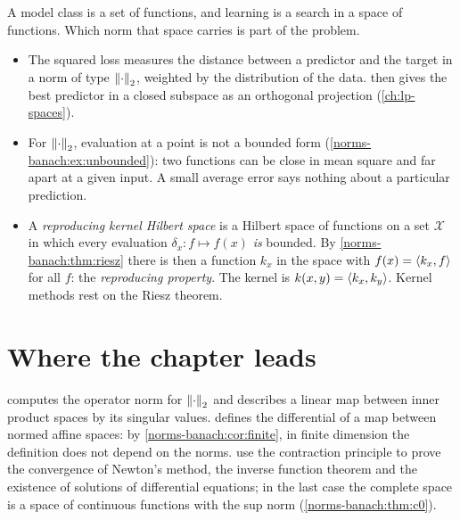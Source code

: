 \begin{notechapter}
\begin{mlthread}
A model class is a set of functions, and learning is a search in a space
of functions. Which norm that space carries is part of the problem.
\begin{itemize}[nosep]
  \item The squared loss measures the distance between a predictor and the
        target in a norm of type $\left\|\cdot\right\|_2$, weighted by the
        distribution of the data.  then
        gives the best predictor in a closed subspace as an orthogonal
        projection (\cref{ch:lp-spaces}).
  \item For $\left\|\cdot\right\|_2$, evaluation at a point is not a bounded form
        (\cref{norms-banach:ex:unbounded}): two functions can be close in
        mean square and far apart at a given input. A small average error
        says nothing about a particular prediction.
  \item A \emph{reproducing kernel Hilbert space} is a Hilbert space of
        functions on a set $\mathcal X$ in which every evaluation
        $\delta_x:f\mapsto f(x)$ \emph{is} bounded. By
        \cref{norms-banach:thm:riesz} there is then a function $k_x$ in
        the space with $f(x) = \left\langle k_x, f \right\rangle$ for all $f$: the
        \emph{reproducing property}. The kernel is
        $k(x, y) = \left\langle k_x, k_y \right\rangle$. Kernel methods rest on the Riesz
        theorem.
\end{itemize}
\end{mlthread}

\section{Where the chapter leads}\label{norms-banach:sec:outlook}

 computes the operator norm for $\left\|\cdot\right\|_2$ and
describes a linear map between inner product spaces by its singular
values.  defines the differential of a map between
normed affine spaces: by \cref{norms-banach:cor:finite}, in finite
dimension the definition does not depend on the norms.
 use the
contraction principle to prove the convergence of Newton's method, the
inverse function theorem and the existence of solutions of differential
equations; in the last case the complete space is a space of continuous
functions with the sup norm (\cref{norms-banach:thm:c0}).


\end{notechapter}
